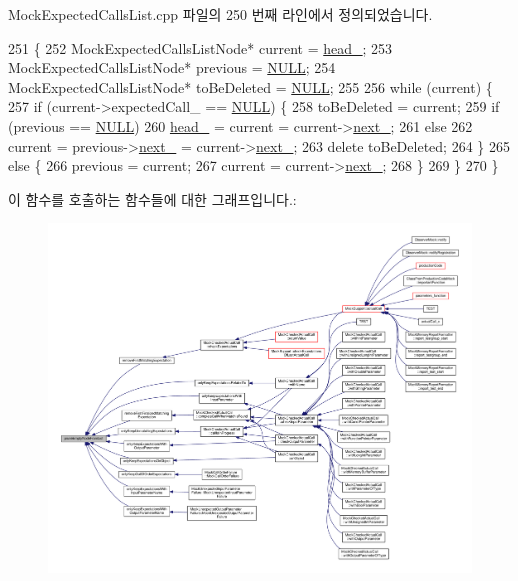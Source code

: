 Mock\+Expected\+Calls\+List.\+cpp 파일의 250 번째 라인에서 정의되었습니다.


\begin{DoxyCode}
251 \{
252     MockExpectedCallsListNode* current = \hyperlink{class_mock_expected_calls_list_a18290c3c0a206882dd8e0d9f446e2fe6}{head\_};
253     MockExpectedCallsListNode* previous = \hyperlink{openavb__types__base__pub_8h_a070d2ce7b6bb7e5c05602aa8c308d0c4}{NULL};
254     MockExpectedCallsListNode* toBeDeleted = \hyperlink{openavb__types__base__pub_8h_a070d2ce7b6bb7e5c05602aa8c308d0c4}{NULL};
255 
256     \textcolor{keywordflow}{while} (current) \{
257         \textcolor{keywordflow}{if} (current->expectedCall\_ == \hyperlink{openavb__types__base__pub_8h_a070d2ce7b6bb7e5c05602aa8c308d0c4}{NULL}) \{
258             toBeDeleted = current;
259             \textcolor{keywordflow}{if} (previous == \hyperlink{openavb__types__base__pub_8h_a070d2ce7b6bb7e5c05602aa8c308d0c4}{NULL})
260                 \hyperlink{class_mock_expected_calls_list_a18290c3c0a206882dd8e0d9f446e2fe6}{head\_} = current = current->\hyperlink{class_mock_expected_calls_list_1_1_mock_expected_calls_list_node_aaae452a372ae14c06a6d5d252df73725}{next\_};
261             \textcolor{keywordflow}{else}
262                 current = previous->\hyperlink{class_mock_expected_calls_list_1_1_mock_expected_calls_list_node_aaae452a372ae14c06a6d5d252df73725}{next\_} = current->\hyperlink{class_mock_expected_calls_list_1_1_mock_expected_calls_list_node_aaae452a372ae14c06a6d5d252df73725}{next\_};
263             \textcolor{keyword}{delete} toBeDeleted;
264         \}
265         \textcolor{keywordflow}{else} \{
266             previous = current;
267             current = current->\hyperlink{class_mock_expected_calls_list_1_1_mock_expected_calls_list_node_aaae452a372ae14c06a6d5d252df73725}{next\_};
268         \}
269     \}
270 \}
\end{DoxyCode}


이 함수를 호출하는 함수들에 대한 그래프입니다.\+:
\nopagebreak
\begin{figure}[H]
\begin{center}
\leavevmode
\includegraphics[width=350pt]{class_mock_expected_calls_list_aeb4c1dd9901800365e942770b132c94b_icgraph}
\end{center}
\end{figure}


